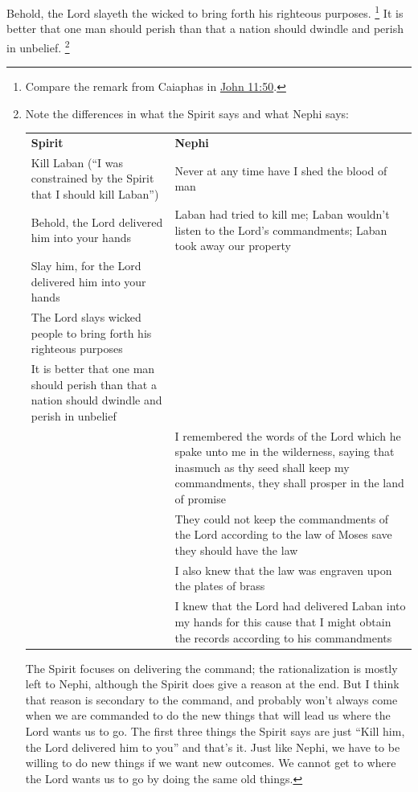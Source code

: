 			Behold, the Lord slayeth the wicked to bring forth his righteous purposes.%
				\footnote{%
					Compare the remark from Caiaphas in \hyperref[JOHN-11-50]{John 11:50}.
					}
			It is better that one man should perish
			than that a nation should dwindle and perish in unbelief.%
				\footnote{%
					\label{1NEPHI-4-13-NOTE-spirit}%
					Note the differences in what the Spirit says and what Nephi says:
					
						\begin{tabular}{p{3in}p{3in}}
						\textbf{Spirit} & \textbf{Nephi} \\
						Kill Laban (``I was constrained by the Spirit that I should kill Laban'') & Never at any time have I shed the blood of man \\
						Behold, the Lord delivered him into your hands & Laban had tried to kill me; Laban wouldn't listen to the Lord's commandments; Laban took away our property \\
						Slay him, for the Lord delivered him into your hands &  \\
						The Lord slays wicked people to bring forth his righteous purposes &  \\
						It is better that one man should perish than that a nation should dwindle and perish in unbelief &  \\
						 & I remembered the words of the Lord which he spake unto me in the wilderness, saying that inasmuch as thy seed shall keep my commandments, they shall prosper in the land of promise \\
						 &  They could not keep the commandments of the Lord according to the law of Moses save they should have the law \\
						 & I also knew that the law was engraven upon the plates of brass \\
						 & I knew that the Lord had delivered Laban into my hands for this cause that I might obtain the records according to his commandments \\
						\end{tabular}
						
					The Spirit focuses on delivering the command; the rationalization is mostly left to Nephi, although the Spirit does give a reason at the end. But I think that reason is secondary to the command, and probably won't always come when we are commanded to do the new things that will lead us where the Lord wants us to go. The first three things the Spirit says are just ``Kill him, the Lord delivered him to you'' and that's it. Just like Nephi, we have to be willing to do new things if we want new outcomes. We cannot get to where the Lord wants us to go by doing the same old things.
					}

